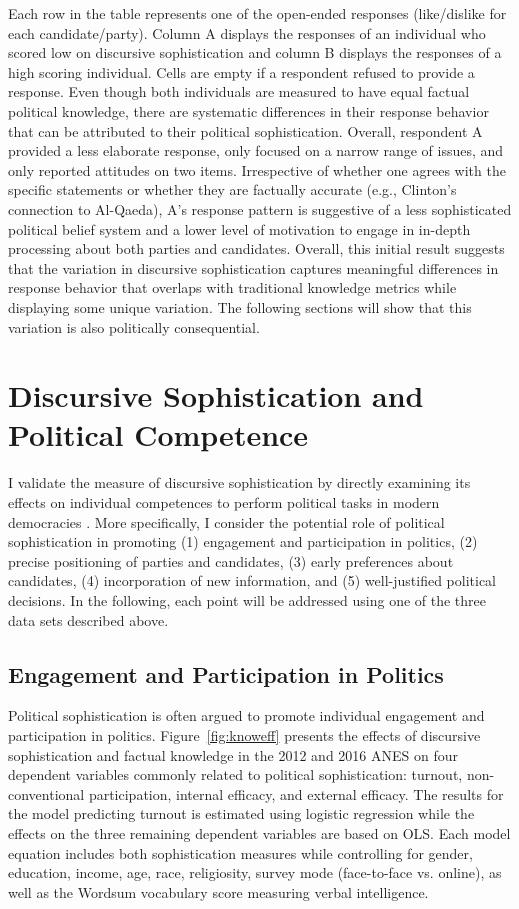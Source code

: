 Each row in the table represents one of the open-ended responses (like/dislike for each candidate/party). Column A displays the responses of an individual who scored low on discursive sophistication and column B displays the responses of a high scoring individual. Cells are empty if a respondent refused to provide a response. Even though both individuals are measured to have equal factual political knowledge, there are systematic differences in their response behavior that can be attributed to their political sophistication. Overall, respondent A provided a less elaborate response, only focused on a narrow range of issues, and only reported attitudes on two items. Irrespective of whether one agrees with the specific statements or whether they are factually accurate (e.g., Clinton's connection to Al-Qaeda), A's response pattern is suggestive of a less sophisticated political belief system and a lower level of motivation to engage in in-depth processing about both parties and candidates. Overall, this initial result suggests that the variation in discursive sophistication captures meaningful differences in response behavior that overlaps with traditional knowledge metrics while displaying some unique variation. The following sections will show that this variation is also politically consequential.



\section*{Discursive Sophistication and Political Competence}

I validate the measure of discursive sophistication by directly examining its effects on individual competences to perform political tasks in modern democracies \citep[c.f.,][]{lupia2006elitism,lupia2015uninformed}. More specifically, I consider the potential role of political sophistication in promoting (1) engagement and participation in politics, (2) precise positioning of parties and candidates, (3) early preferences about candidates, (4) incorporation of new information, and (5) well-justified political decisions. In the following, each point will be addressed using one of the three data sets described above.


\subsection*{Engagement and Participation in Politics}
Political sophistication is often argued to promote individual engagement and participation in politics. Figure~\ref{fig:knoweff} presents the effects of discursive sophistication and factual knowledge in the 2012 and 2016 ANES on four dependent variables commonly related to political sophistication: turnout, non-conventional participation, internal efficacy, and external efficacy. The results for the model predicting turnout is estimated using logistic regression while the effects on the three remaining dependent variables are based on OLS. Each model equation includes both sophistication measures while controlling for gender, education, income, age, race, religiosity, survey mode (face-to-face vs. online), as well as the Wordsum vocabulary score measuring verbal intelligence.

